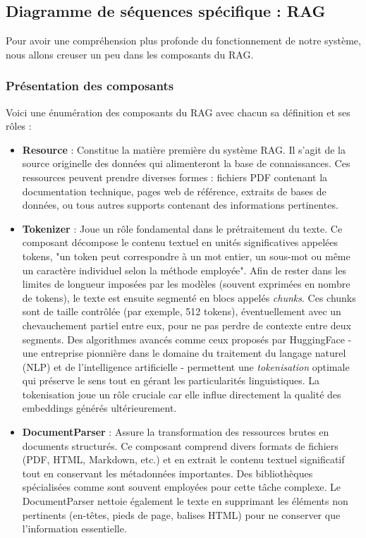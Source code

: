 \documentclass[12pt,a4paper]{report}
\begin{document}
	\subsection{Diagramme de séquences spécifique : RAG}
	
	Pour avoir une compréhension plus profonde du fonctionnement de notre système, nous allons creuser un peu dans les composants du RAG.
	
	\subsubsection{Présentation des composants}
	
	Voici une énumération des composants du RAG avec chacun sa définition et ses rôles :
	
	\begin{itemize}
		
		\item \textbf{Resource} : Constitue la matière première du système RAG. Il s'agit de la source originelle des données qui alimenteront la base de connaissances. Ces ressources peuvent prendre diverses formes : fichiers PDF contenant la documentation technique, pages web de référence, extraits de bases de données, ou tous autres supports contenant des informations pertinentes.
		
		\item \textbf{Tokenizer} : Joue un rôle fondamental dans le prétraitement du texte. Ce composant décompose le contenu textuel en unités significatives appelées tokens, "un token peut correspondre à un mot entier, un sous-mot ou même un caractère individuel selon la méthode employée". Afin de rester dans les limites de longueur imposées par les modèles (souvent exprimées en nombre de tokens), le texte est ensuite segmenté en blocs appelés \textit{chunks}. Ces chunks sont de taille contrôlée (par exemple, 512 tokens), éventuellement avec un chevauchement partiel entre eux, pour ne pas perdre de contexte entre deux segments. Des algorithmes avancés comme ceux proposés par HuggingFace - une entreprise pionnière dans le domaine du traitement du langage naturel (NLP) et de l’intelligence artificielle - permettent une \textit{tokenisation} optimale qui préserve le sens tout en gérant les particularités linguistiques. La tokenisation joue un rôle cruciale car elle influe directement la qualité des embeddings générés ultérieurement.
		
		\item \textbf{DocumentParser} : Assure la transformation des ressources brutes en documents structurés. Ce composant comprend divers formats de fichiers (PDF, HTML, Markdown, etc.) et en extrait le contenu textuel significatif tout en conservant les métadonnées importantes. Des bibliothèques spécialisées comme sont souvent employées pour cette tâche complexe. Le DocumentParser nettoie également le texte en supprimant les éléments non pertinents (en-têtes, pieds de page, balises HTML) pour ne conserver que l'information essentielle.
		

\end{itemize}
\end{document}
